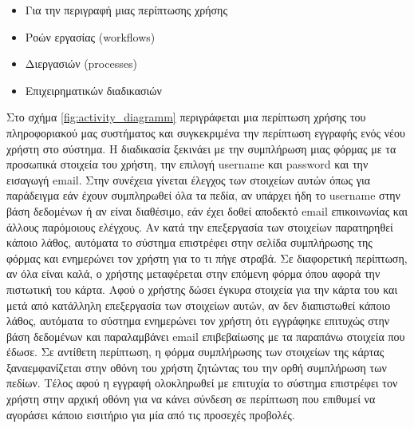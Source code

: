 \documentclass{assignment}
\begin{document}
\begin{itemize}
\item Για την περιγραφή μιας περίπτωσης χρήσης
\item Ροών εργασίας (workflows)
\item Διεργασιών (processes)
\item Επιχειρηματικών διαδικασιών
\end{itemize}

Στο σχήμα \ref{fig:activity_diagramm} περιγράφεται μια περίπτωση χρήσης του πληροφοριακού μας συστήματος και συγκεκριμένα την περίπτωση εγγραφής ενός νέου χρήστη στο σύστημα. Η διαδικασία ξεκινάει με την συμπλήρωση μιας φόρμας με τα προσωπικά στοιχεία του χρήστη, την επιλογή username και password και την εισαγωγή email. Στην συνέχεια γίνεται έλεγχος των στοιχείων αυτών όπως για παράδειγμα εάν έχουν συμπληρωθεί όλα τα πεδία, αν υπάρχει ήδη το username στην βάση δεδομένων ή αν είναι διαθέσιμο, εάν έχει δοθεί αποδεκτό email επικοινωνίας και άλλους παρόμοιους ελέγχους. Αν κατά την επεξεργασία των στοιχείων παρατηρηθεί κάποιο λάθος, αυτόματα το σύστημα επιστρέφει στην σελίδα συμπλήρωσης της φόρμας και ενημερώνει τον χρήστη για το τι πήγε στραβά. Σε διαφορετική περίπτωση, αν όλα είναι καλά, ο χρήστης μεταφέρεται στην επόμενη φόρμα όπου αφορά την πιστωτική του κάρτα. Αφού ο χρήστης δώσει έγκυρα στοιχεία για την κάρτα του και μετά από κατάλληλη επεξεργασία των στοιχείων αυτών, αν δεν διαπιστωθεί κάποιο λάθος, αυτόματα το σύστημα ενημερώνει τον χρήστη ότι εγγράφηκε επιτυχώς στην βάση δεδομένων και παραλαμβάνει email επιβεβαίωσης με τα παραπάνω στοιχεία που έδωσε. Σε αντίθετη περίπτωση, η φόρμα συμπλήρωσης των στοιχείων της κάρτας ξαναεμφανίζεται στην οθόνη του χρήστη ζητώντας του την ορθή συμπλήρωση των πεδίων. Τέλος αφού η εγγραφή ολοκληρωθεί με επιτυχία το σύστημα επιστρέφει τον χρήστη στην αρχική οθόνη για να κάνει σύνδεση σε περίπτωση που επιθυμεί να αγοράσει κάποιο εισιτήριο για μία από τις προσεχές προβολές.
\end{document}
